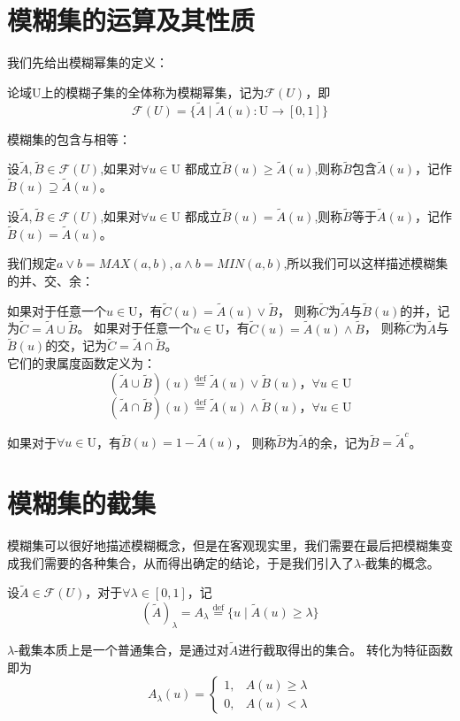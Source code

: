 \section{模糊集的运算及其性质}
我们先给出模糊幂集的定义：
\begin{definition}
    论域$\mathrm{U}$上的模糊子集的全体称为模糊幂集，记为$\mathscr{F}(U)$，即
    \[
        \mathscr{F}(U)=\{\tilde{A} \mid \tilde{A}(u):\mathrm{U} \to [0,1]\}
    \]
\end{definition}
模糊集的包含与相等：
\begin{definition}
    设$\tilde{A}, \tilde{B} \in \mathscr{F}(U)$,如果对$\forall u \in \mathrm{U}$
    都成立$\tilde{B}(u)\geqslant \tilde{A}(u)$,则称$\tilde{B}$包含$\tilde{A}(u)$，记作$\tilde{B}(u )\supseteq \tilde{A}(u)$。
\end{definition}
\begin{definition}
    设$\tilde{A}, \tilde{B} \in \mathscr{F}(U)$,如果对$\forall u \in \mathrm{U}$
    都成立$\tilde{B}(u) = \tilde{A}(u)$,则称$\tilde{B}$等于$\tilde{A}(u)$，记作$\tilde{B}(u)= \tilde{A}(u)$。
\end{definition}
我们规定$a\vee b=MAX(a,b),a\wedge b=MIN(a,b)$,所以我们可以这样描述模糊集的并、交、余：

\begin{definition}
    如果对于任意一个$u \in \mathrm{U}$，有$\tilde{C}(u)=\tilde{A}(u) \vee \tilde{B}$，
    则称$\tilde{C}$为$\tilde{A}$与$\tilde{B}(u)$的并，记为$\tilde{C}=\tilde{A} \cup \tilde{B}$。
    如果对于任意一个$u \in \mathrm{U}$，有$\tilde{C}(u)=\tilde{A}(u) \wedge \tilde{B}$，
    则称$\tilde{C}$为$\tilde{A}$与$\tilde{B}(u)$的交，记为$\tilde{C}=\tilde{A} \cap \tilde{B}$。\\
    它们的隶属度函数定义为：
    \[
        (\tilde{A}\cup  \tilde{B})(u) \stackrel{\mathrm{def} }{=}\tilde{A}(u) \vee \tilde{B}(u) ， \forall u \in \mathrm{U}
    \]
    \[
        (\tilde{A}\cap  \tilde{B})(u) \stackrel{\mathrm{def} }{=}\tilde{A}(u) \wedge \tilde{B}(u) ，\forall u \in \mathrm{U}
    \]
\end{definition}
\begin{definition}
    如果对于$\forall u \in \mathrm{U}$，有$\tilde{B}(u)=1-\tilde{A}(u) $，
    则称$\tilde{B}$为$\tilde{A}$的余，记为$\tilde{B}=\tilde{A}^c$。
\end{definition}
\section{模糊集的截集}
模糊集可以很好地描述模糊概念，但是在客观现实里，我们需要在最后把模糊集变成我们需要的各种集合，从而得出确定的结论，于是我们引入了$\lambda$-截集的概念。
\begin{definition}
    设$\tilde{A}\in \mathscr{F}(U)$，对于$\forall \lambda \in [0,1]$，记
    \[
        (\tilde{A})_{\lambda}=A_{\lambda} \stackrel{\mathrm{def}}{=}\{u \mid \tilde{A}(u) \geqslant \lambda\}
    \]
\end{definition}
$\lambda$-截集本质上是一个普通集合，是通过对$\tilde{A}$进行截取得出的集合。
转化为特征函数即为
\[
    A_{\lambda}(u)=\left\{\begin{array}{ll}
        1, & A(u) \geqslant \lambda \\
        0, & A(u)<\lambda
    \end{array}\right.
\]